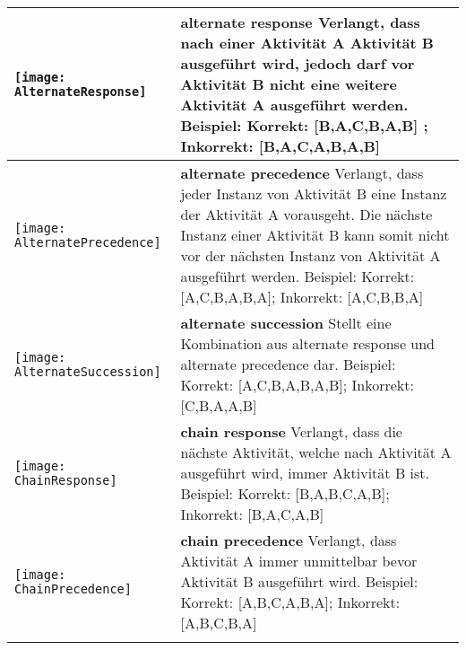 \begin{longtable}{|p{}|p{}|}
\begin{center}
  \texttt{[image: AlternateResponse]} %
    \end{center} &
\textbf{alternate response} \newline  Verlangt, dass nach einer Aktivität A Aktivität B ausgeführt wird, jedoch darf vor Aktivität B nicht eine weitere Aktivität A ausgeführt werden. \newline
Beispiel: Korrekt: [B,A,C,B,A,B] ; Inkorrekt: [B,A,C,A,B,A,B] \\

\hline

\begin{center}

  \texttt{[image: AlternatePrecedence]} %
    \end{center} &
\textbf{alternate precedence}\newline
  Verlangt, dass jeder Instanz von Aktivität B eine Instanz der Aktivität A vorausgeht. Die nächste Instanz einer Aktivität B kann somit nicht vor der nächsten Instanz von Aktivität A ausgeführt werden.
  \newline
  Beispiel: Korrekt: [A,C,B,A,B,A]; Inkorrekt: [A,C,B,B,A]\\
\hline
\begin{center}

  \texttt{[image: AlternateSuccession]} %
    \end{center}&
\textbf{alternate succession} \newline
 Stellt eine Kombination aus alternate response und alternate precedence dar. \newline
  Beispiel:  Korrekt: [A,C,B,A,B,A,B]; Inkorrekt: [C,B,A,A,B] \\
\hline
\begin{center}

  \texttt{[image: ChainResponse]} %
    \end{center}&
 \textbf{chain response}\newline
  Verlangt, dass die nächste Aktivität, welche nach Aktivität A ausgeführt wird, immer Aktivität B ist. \newline
  Beispiel: Korrekt: [B,A,B,C,A,B]; Inkorrekt: [B,A,C,A,B]\\
\hline
\begin{center}

  \texttt{[image: ChainPrecedence]} %
    \end{center}&
\textbf{chain precedence} \newline
 Verlangt, dass Aktivität A immer unmittelbar bevor Aktivität B ausgeführt wird.\newline
 Beispiel: Korrekt: [A,B,C,A,B,A]; Inkorrekt: [A,B,C,B,A] \\
\hline
\begin{center}


\end{center}
\end{longtable}

